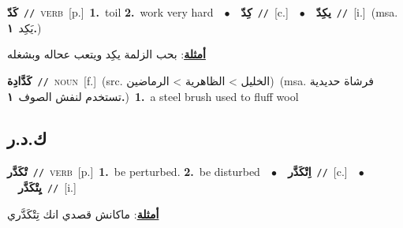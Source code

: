\documentclass[10pt,a4paper,twoside]{article} %
\begin{document}
\begin{multicols}{2}
{\setlength\topsep{0pt}\textbf{\foreignlanguage{arabic}{كَدّ}}\ {\color{gray}\texttt{//}\color{black}}\ \textsc{verb}\ [p.]\ \textbf{1.}~toil  \textbf{2.}~work very hard\ \ $\bullet$\ \ \setlength\topsep{0pt}\textbf{\foreignlanguage{arabic}{كِدّ}}\ {\color{gray}\texttt{//}\color{black}}\ [c.]\ \ $\bullet$\ \ \setlength\topsep{0pt}\textbf{\foreignlanguage{arabic}{يكِدّ}}\ {\color{gray}\texttt{//}\color{black}}\ [i.]\ \color{gray}(msa. \foreignlanguage{arabic}{يَكِد}~\foreignlanguage{arabic}{\textbf{١.}})\color{black}\  \begin{flushright}\color{gray}\foreignlanguage{arabic}{\textbf{\underline{\foreignlanguage{arabic}{أمثلة}}}: بحب الزلمة يكِد ويتعب عحاله وبشغله}\end{flushright}\color{black}} \vspace{2mm}

{\setlength\topsep{0pt}\textbf{\foreignlanguage{arabic}{كَدَّادِة}}\ {\color{gray}\texttt{//}\color{black}}\ \textsc{noun}\ [f.]\ (src. \color{gray}\foreignlanguage{arabic}{الخليل > الظاهرية > الرماضين}\color{black})\ \color{gray}(msa. \foreignlanguage{arabic}{فرشاة حديدية تستخدم لنفش الصوف}~\foreignlanguage{arabic}{\textbf{١.}})\color{black}\ \textbf{1.}~a steel brush used to fluff wool\ } \vspace{2mm}

\vspace{-3mm}
\subsection*{\color{blue}\foreignlanguage{arabic}{ك.د.ر}\color{blue}{}} 

{\setlength\topsep{0pt}\textbf{\foreignlanguage{arabic}{تْكَدَّر}}\ {\color{gray}\texttt{//}\color{black}}\ \textsc{verb}\ [p.]\ \textbf{1.}~be perturbed.  \textbf{2.}~be disturbed\ \ $\bullet$\ \ \setlength\topsep{0pt}\textbf{\foreignlanguage{arabic}{اِتْكَدَّر}}\ {\color{gray}\texttt{//}\color{black}}\ [c.]\ \ $\bullet$\ \ \setlength\topsep{0pt}\textbf{\foreignlanguage{arabic}{يِتْكَدَّر}}\ {\color{gray}\texttt{//}\color{black}}\ [i.]\  \begin{flushright}\color{gray}\foreignlanguage{arabic}{\textbf{\underline{\foreignlanguage{arabic}{أمثلة}}}: ماكانش قصدي انك تِتْكَدَّري}\end{flushright}\color{black}} \vspace{2mm}


\end{multicols}
\end{document}
